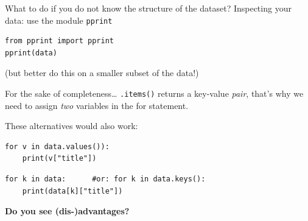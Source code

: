 \documentclass{beamer}
\begin{document}
\begin{frame}[fragile]{What to do if you do not know the structure of the dataset?}
Inspecting your data: use the module \texttt{pprint} 
\begin{lstlisting}
from pprint import pprint
pprint(data)
\end{lstlisting}

(but better do this on a smaller subset of the data!)
\end{frame}


\begin{frame}[plain]{}
\end{frame}

\begin{frame}[plain]{}
\end{frame}


\begin{frame}[fragile]{For the sake of completeness\ldots}
\texttt{.items()} returns a key-value \emph{pair}, that's why we need to assign \emph{two} variables in the for statement.

These alternatives would also work:
\begin{lstlisting}
for v in data.values()):
	print(v["title"])
\end{lstlisting}

\begin{lstlisting}
for k in data:      #or: for k in data.keys():
	print(data[k]["title"])
\end{lstlisting}

\textbf{Do you see (dis-)advantages?}
\end{frame}
\end{document}
